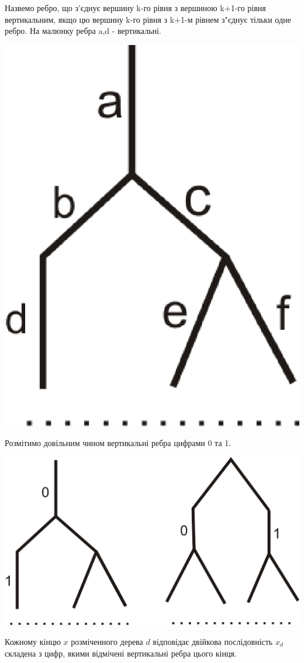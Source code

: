 \documentclass[a4paper,12pt]{article} \usepackage{a4wide}
\numberwithin{equation}{subsection}
\begin{document}
Назвемо ребро, що з'єднує вершину k-го рівня з вершиною k+1-го рівня вертикальним, якщо цю вершину
 k-го рівня з k+1-м рівнем з"єднує тільки одне ребро. На малюнку ребра a,d - вертикальні.
 \begin{center}
\includegraphics[scale=0.5]{Vert.eps}
\end{center}
Розмітимо довільним чином вертикальні ребра цифрами 0 та 1.
\begin{center}
\includegraphics[scale=0.3]{MarkTr.eps}
\end{center}
Кожному кінцю $x$ розміченного дерева $d$ відповідає двійкова послідовність  $x_d$ складена з цифр,
 якими відмічені вертикальні ребра цього кінця.
\end{document}

